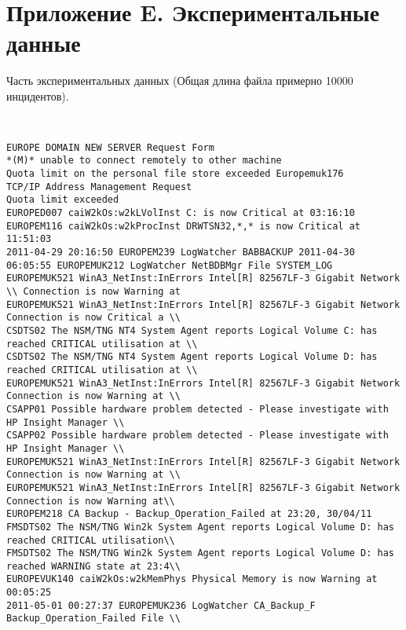 \clearpage
\chapter{Приложение E. Экспериментальные данные}\label{AppendixE}
Часть экспериментальных данных (Общая длина файла примерно 10000 инцидентов).
\begin{lstlisting}
	

EUROPE DOMAIN NEW SERVER Request Form
*(M)* unable to connect remotely to other machine 
Quota limit on the personal file store exceeded Europemuk176 
TCP/IP Address Management Request 
Quota limit exceeded 
EUROPED007 caiW2kOs:w2kLVolInst C: is now Critical at 03:16:10
EUROPEM116 caiW2kOs:w2kProcInst DRWTSN32,*,* is now Critical at 11:51:03
2011-04-29 20:16:50 EUROPEM239 LogWatcher BABBACKUP 2011-04-30 06:05:55 EUROPEMUK212 LogWatcher NetBDBMgr File SYSTEM_LOG 
EUROPEMUK521 WinA3_NetInst:InErrors Intel[R] 82567LF-3 Gigabit Network \\ Connection is now Warning at 
EUROPEMUK521 WinA3_NetInst:InErrors Intel[R] 82567LF-3 Gigabit Network Connection is now Critical a \\
CSDTS02 The NSM/TNG NT4 System Agent reports Logical Volume C: has reached CRITICAL utilisation at \\
CSDTS02 The NSM/TNG NT4 System Agent reports Logical Volume D: has reached CRITICAL utilisation at \\
EUROPEMUK521 WinA3_NetInst:InErrors Intel[R] 82567LF-3 Gigabit Network Connection is now Warning at \\
CSAPP01 Possible hardware problem detected - Please investigate with HP Insight Manager \\
CSAPP02 Possible hardware problem detected - Please investigate with HP Insight Manager \\
EUROPEMUK521 WinA3_NetInst:InErrors Intel[R] 82567LF-3 Gigabit Network Connection is now Warning at \\
EUROPEMUK521 WinA3_NetInst:InErrors Intel[R] 82567LF-3 Gigabit Network Connection is now Warning at\\
EUROPEM218 CA Backup - Backup_Operation_Failed at 23:20, 30/04/11
FMSDTS02 The NSM/TNG Win2k System Agent reports Logical Volume D: has reached CRITICAL utilisation\\
FMSDTS02 The NSM/TNG Win2k System Agent reports Logical Volume D: has reached WARNING state at 23:4\\
EUROPEVUK140 caiW2kOs:w2kMemPhys Physical Memory is now Warning at 00:05:25
2011-05-01 00:27:37 EUROPEMUK236 LogWatcher CA_Backup_F Backup_Operation_Failed File \\

\end{lstlisting}
